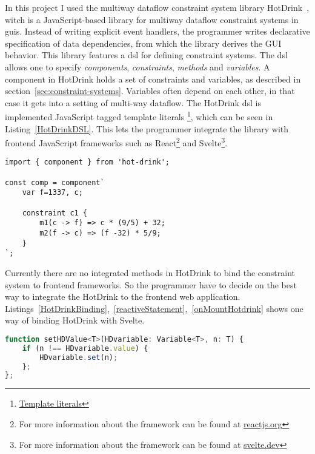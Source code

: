 In this project I used the multiway dataflow constraint system library 
HotDrink~\cite{HotDrink}, witch is a JavaScript-based library for multiway dataflow 
constraint systems in \gls{gui}s. Instead of writing explicit event handlers,
the programmer writes declarative specification of data dependencies,
from which the library derives the GUI behavior.
This library features a \gls{dsl} for defining constraint systems.
The \gls{dsl} allows one to specify \emph{components}, \emph{constraints}, \emph{methods} 
and \emph{variables}.
A component in HotDrink holds a set of constraints and variables, as described in 
section~\ref{sec:constraint-systems}. Variables often depend on each other,
in that case it gets into a setting of multi-way dataflow.
The HotDrink \gls{dsl} is implemented JavaScript tagged template literals
\footnote{\href{https://developer.mozilla.org/en-US/docs/Web/JavaScript/Reference/Template_literals}{Template literals}}, 
which can be seen in Listing~\ref{HotDrinkDSL}. This lets the programmer integrate the 
library with frontend JavaScript frameworks such as 
React\footnote{For more information about the framework can be found at \href{https://reactjs.org/}{reactjs.org}} and 
Svelte\footnote{For more information about the framework can be found at \href{https://svelte.dev/}{svelte.dev}}. 

\begin{lstlisting}[caption={Example of the HotDrink \gls{dsl}},label=HotDrinkDSL, language=hotdrink]
import { component } from 'hot-drink';

const comp = component`
    var f=1337, c;

    constraint c1 {
        m1(c -> f) => c * (9/5) + 32;
        m2(f -> c) => (f -32) * 5/9;
    }
`;
\end{lstlisting}

Currently there are no integrated methods in HotDrink to bind the constraint system to 
frontend frameworks. So the programmer have to decide on the best way to integrate the 
HotDrink to the frontend web application. 
Listings~\ref{HotDrinkBinding},~\ref{reactiveStatement},~\ref{onMountHotdrink} shows one 
way of binding HotDrink with Svelte.

\begin{lstlisting}[caption={Function for binding HotDrink and Svelte variable},label=HotDrinkBinding, language=javascript]
function setHDValue<T>(HDvariable: Variable<T>, n: T) {
    if (n !== HDvariable.value) { 
        HDvariable.set(n);
    };
};
\end{lstlisting}

